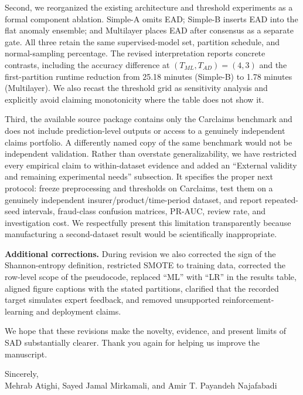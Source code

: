 \documentclass[11pt]{article}
\begin{document}
Second, we reorganized the existing architecture and threshold experiments as
a formal component ablation. Simple-A omits EAD; Simple-B inserts EAD into the
flat anomaly ensemble; and Multilayer places EAD after consensus as a separate
gate. All three retain the same supervised-model set, partition schedule, and
normal-sampling percentage. The revised interpretation reports concrete
contrasts, including the accuracy difference at
$(T_{ML},T_{AD})=(4,3)$ and the first-partition runtime reduction from 25.18
minutes (Simple-B) to 1.78 minutes (Multilayer). We also recast the threshold
grid as sensitivity analysis and explicitly avoid claiming monotonicity where
the table does not show it.

Third, the available source package contains only the Carclaims benchmark and
does not include prediction-level outputs or access to a genuinely independent
claims portfolio. A differently named copy of the same benchmark would not be
independent validation. Rather than overstate generalizability, we have
restricted every empirical claim to within-dataset evidence and added an
``External validity and remaining experimental needs'' subsection. It specifies
the proper next protocol: freeze preprocessing and thresholds on Carclaims,
test them on a genuinely independent insurer/product/time-period dataset, and
report repeated-seed intervals, fraud-class confusion matrices, PR-AUC, review
rate, and investigation cost. We respectfully present this limitation
transparently because manufacturing a second-dataset result would be
scientifically inappropriate.

\textbf{Additional corrections.} During revision we also corrected the sign of
the Shannon-entropy definition, restricted SMOTE to training data, corrected
the row-level scope of the pseudocode, replaced ``ML'' with ``LR'' in the
results table, aligned figure captions with the stated partitions, clarified
that the recorded target simulates expert feedback, and removed unsupported
reinforcement-learning and deployment claims.

We hope that these revisions make the novelty, evidence, and present limits of
SAD substantially clearer. Thank you again for helping us improve the
manuscript.

Sincerely,\\
Mehrab Atighi, Sayed Jamal Mirkamali, and Amir T. Payandeh Najafabadi
\end{document}
